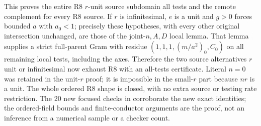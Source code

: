 This proves the entire R8 $r$-unit source subdomain all tests and
the remote complement for every R8 source.  If $r$ is infinitesimal,
$e$ is a unit and $g>0$ forces bounded $a$ with $a_0<1$; precisely
these hypotheses, with every other original intersection unchanged,
are those of the joint-$n,A,D$ local lemma.  That lemma supplies a
strict full-parent Gram with residue $(1,1,1,(m/a^2)_0,C_0)$ on
all remaining local tests, including the axes.  Therefore the two
source alternatives $r$ unit or infinitesimal now exhaust R8 with
an all-tests certificate.  Literal $n=0$ was retained in the unit-$r$
proof; it is impossible in the small-$r$ part because $nr$ is a unit.
The whole ordered R8 shape is closed, with no extra source or testing
rate restriction.  The 20 new focused checks in 
corroborate the new exact identities; the ordered-field bounds and
finite-conductor arguments are the proof, not an inference from a
numerical sample or a checker count.
